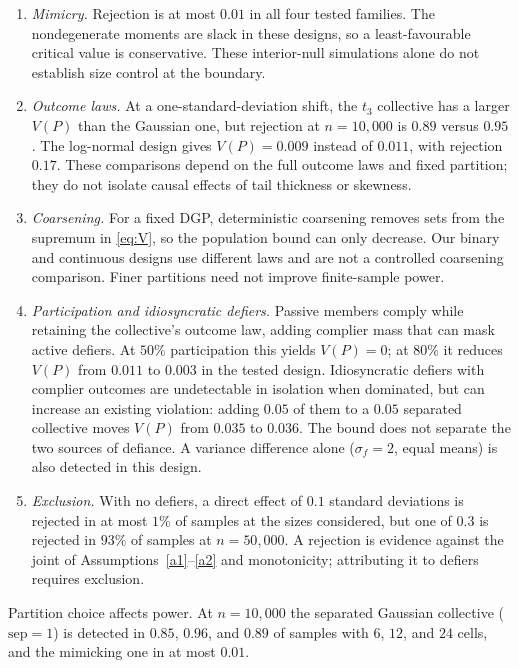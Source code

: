 \documentclass{article}
\theoremstyle{remark}
\begin{document}
\begin{enumerate}[leftmargin=1.4em,itemsep=2pt,topsep=2pt]
\item \emph{Mimicry.} Rejection is at most $0.01$ in all four tested families. The nondegenerate moments are slack in these designs, so a least-favourable critical value is conservative. These interior-null simulations alone do not establish size control at the boundary.
\item \emph{Outcome laws.} At a one-standard-deviation shift, the $t_3$ collective has a larger $V(P)$ than the Gaussian one, but rejection at $n=10{,}000$ is $0.89$ versus $0.95$. The log-normal design gives $V(P)=0.009$ instead of $0.011$, with rejection $0.17$. These comparisons depend on the full outcome laws and fixed partition; they do not isolate causal effects of tail thickness or skewness.
\item \emph{Coarsening.} For a fixed DGP, deterministic coarsening removes sets
from the supremum in \eqref{eq:V}, so the population bound can only decrease.
Our binary and continuous designs use different laws and are not a controlled
coarsening comparison. Finer partitions need not improve finite-sample power.
\item \emph{Participation and idiosyncratic defiers.} Passive members comply
while retaining the collective's outcome law, adding complier mass that can
mask active defiers. At $50\%$ participation this yields $V(P)=0$; at $80\%$
it reduces $V(P)$ from $0.011$ to $0.003$ in the tested design. Idiosyncratic
defiers with complier outcomes are undetectable in isolation when dominated,
but can increase an existing violation: adding $0.05$ of them to a $0.05$
separated collective moves $V(P)$ from $0.035$ to $0.036$. The bound does not
separate the two sources of defiance. A variance difference alone
($\sigma_f=2$, equal means) is also detected in this design.
\item \emph{Exclusion.} With no defiers, a direct effect of $0.1$ standard deviations is rejected in at most $1\%$ of samples at the sizes considered, but one of $0.3$ is rejected in $93\%$ of samples at $n=50{,}000$. A rejection is evidence against the joint of Assumptions~\ref{a1}--\ref{a2} and monotonicity; attributing it to defiers requires exclusion.
\end{enumerate}
Partition choice affects power. At $n=10{,}000$ the separated Gaussian collective ($\mathrm{sep}=1$) is detected in $0.85$, $0.96$, and $0.89$ of samples with $6$, $12$, and $24$ cells, and the mimicking one in at most $0.01$.
\end{document}
